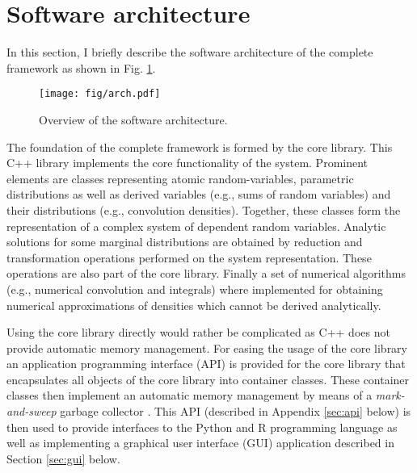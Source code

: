 \section{Software architecture}
In this section, I briefly describe the software architecture of the complete 
framework as shown in Fig. \ref{fig:arch}. 

\begin{figure} [!ht]
 \centering
 \texttt{[image: fig/arch.pdf]}
 \caption{Overview of the  software architecture.} \label{fig:arch}
\end{figure}

The foundation of the complete framework is formed by the  core library. This C++
library implements the core functionality of the system. Prominent elements are classes
representing atomic random-variables, parametric distributions as well as derived
variables (e.g., sums of random variables) and their distributions (e.g., convolution densities).  
Together, these classes form the representation of a complex system of dependent random variables.
Analytic solutions for some marginal distributions are obtained by reduction and transformation
operations performed on the system representation. These operations are also part of the core
library. Finally a set of numerical algorithms (e.g., numerical convolution and integrals) where
implemented for obtaining numerical approximations of densities which cannot
be derived analytically. 

Using the core library directly would rather be complicated as C++ does not provide automatic
memory management. For easing the usage of the core library an application programming interface
(API) is provided for the core library that encapsulates all objects of the core library into
container classes. These container classes then implement an automatic memory management by
means of a \emph{mark-and-sweep} garbage collector \cite[e.g.,][]{Aho2007}. This API (described
in Appendix \ref{sec:api} below) is then used to provide interfaces to the Python and R programming
language as well as implementing a graphical user interface (GUI) application described in Section 
\ref{sec:gui} below.